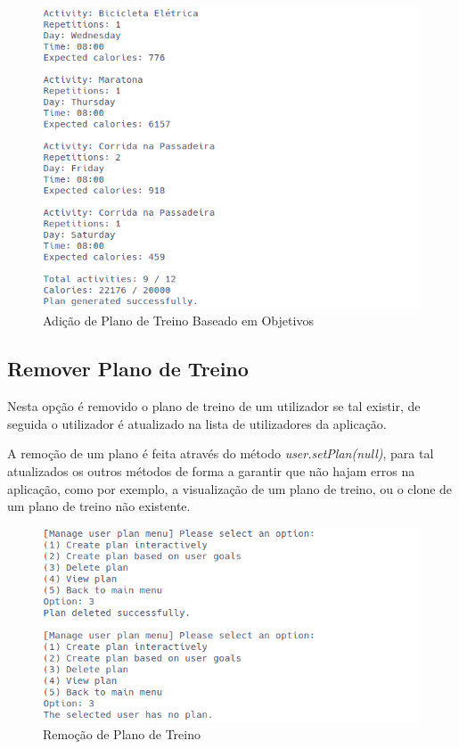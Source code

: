 \documentclass[a4paper,12pt]{scrreprt}
\begin{document}
    \begin{figure}[!ht]
        \centering
        \includegraphics[width=\textwidth]{images/createPlanGoals2.png}
        \caption{Adição de Plano de Treino Baseado em Objetivos}
        \label{fig:add-plan-goals-2}
    \end{figure}

    \clearpage
    \subsection{Remover Plano de Treino}
    Nesta opção é removido o plano de treino de um utilizador se tal existir,
    de seguida o utilizador é atualizado na lista de utilizadores da aplicação.

    A remoção de um plano é feita através do método \textit{user.setPlan(null)},
    para tal atualizados os outros métodos de forma a garantir que não hajam
    erros na aplicação, como por exemplo, a visualização de um plano de treino,
    ou o clone de um plano de treino não existente.

    \begin{figure}[!ht]
        \centering
        \includegraphics[width=\textwidth]{images/deletePlan.png}
        \caption{Remoção de Plano de Treino}
        \label{fig:remove-plan}
    \end{figure}
\end{document}
